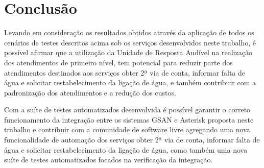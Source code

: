 \chapter[Conclusão]{\textbf{C}onclusão}

Levando em consideração os resultados obtidos através da aplicação de todos os cenários de testes descritos acima sob os serviços desenvolvidos neste trabalho, é possível afirmar que a utilização da Unidade de Resposta Audível na realização dos atendimentos de primeiro nível, tem potencial para reduzir parte dos atendimentos destinados aos serviços obter 2ª via de conta, informar falta de água e solicitar restabelecimento da ligação de água, e também contribuir com a padronização dos atendimentos e a redução dos custos.

Com a suíte de testes automatizados desenvolvida é possível garantir o correto funcionamento da integração entre os sistemas GSAN e Asterisk proposta neste trabalho e contribuir com a comunidade de software livre agregando uma nova funcionalidade de automação dos serviços obter 2ª via de conta, informar falta de água e solicitar restabelecimento da ligação de água, como também uma nova suíte de testes automatizados focados na verificação da integração.
 


